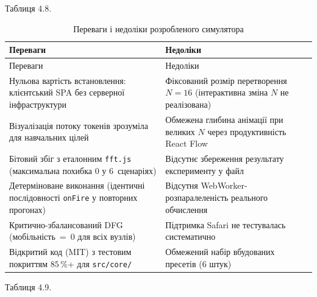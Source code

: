 \documentclass[
]{article}
\begin{document}
Таблиця 4.8.

\begin{longtable}[]{@{}
  >{\raggedright\arraybackslash}p{}
  >{\raggedright\arraybackslash}p{}@{}}
\caption{Переваги і недоліки розробленого симулятора}\tabularnewline
\toprule\noalign{}
\begin{minipage}[b]{\linewidth}\raggedright
Переваги
\end{minipage} & \begin{minipage}[b]{\linewidth}\raggedright
Недоліки
\end{minipage} \\
\midrule\noalign{}
\endfirsthead
\toprule\noalign{}
\begin{minipage}[b]{\linewidth}\raggedright
Переваги
\end{minipage} & \begin{minipage}[b]{\linewidth}\raggedright
Недоліки
\end{minipage} \\
\midrule\noalign{}
\endhead
\bottomrule\noalign{}
\endlastfoot
Нульова вартість встановлення: клієнтський SPA без серверної
інфраструктури & Фіксований розмір перетворення \(N = 16\) (інтерактивна
зміна \(N\) не реалізована) \\
Візуалізація потоку токенів зрозуміла для навчальних цілей & Обмежена
глибина анімації при великих \(N\) через продуктивність React Flow \\
Бітовий збіг з еталонним \texttt{fft.js} (максимальна похибка \(0\) у
6~сценаріях) & Відсутнє збереження результату експерименту у файл \\
Детерміноване виконання (ідентичні послідовності \texttt{onFire} у
повторних прогонах) & Відсутня WebWorker-розпаралеленість реального
обчислення \\
Критично-збалансований DFG (мобільність~=~0 для всіх вузлів) &
Підтримка Safari не тестувалась систематично \\
Відкритий код (MIT) з тестовим покриттям \(85\,\%\)+ для
\texttt{src}\texttt{/}\texttt{core}\texttt{/} & Обмежений набір
вбудованих пресетів (6 штук) \\
\end{longtable}

Таблиця 4.9.
\end{document}

